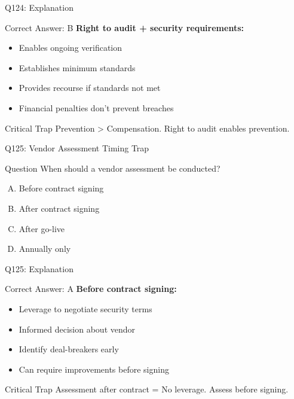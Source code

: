 \documentclass{beamer}
\begin{document}
	\begin{frame}{Q124: Explanation}
		\begin{block}{Correct Answer: B}
			\textbf{Right to audit + security requirements:}
			\begin{itemize}
				\item Enables ongoing verification
				\item Establishes minimum standards
				\item Provides recourse if standards not met
				\item Financial penalties don't prevent breaches
			\end{itemize}
		\end{block}
		\begin{alertblock}{Critical Trap}
			Prevention > Compensation.
			Right to audit enables prevention.
		\end{alertblock}
	\end{frame}
	
	\begin{frame}{Q125: Vendor Assessment Timing Trap}
		\begin{block}{Question}
			When should a vendor assessment be conducted?
		\end{block}
		\begin{enumerate}[(A)]
			\item Before contract signing
			\item After contract signing
			\item After go-live
			\item Annually only
		\end{enumerate}
	\end{frame}
	
	\begin{frame}{Q125: Explanation}
		\begin{block}{Correct Answer: A}
			\textbf{Before contract signing:}
			\begin{itemize}
				\item Leverage to negotiate security terms
				\item Informed decision about vendor
				\item Identify deal-breakers early
				\item Can require improvements before signing
			\end{itemize}
		\end{block}
		\begin{alertblock}{Critical Trap}
			Assessment after contract = No leverage.
			Assess before signing.
		\end{alertblock}
	\end{frame}
	
\end{document}
